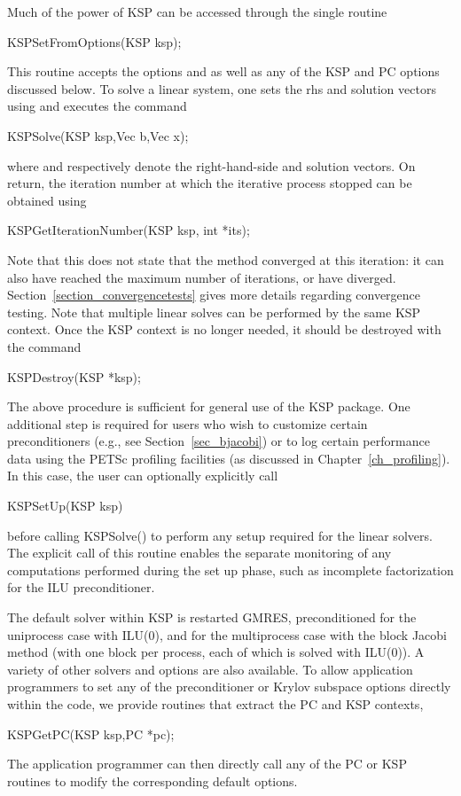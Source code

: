 Much of the power of KSP can be accessed through the single routine
\begin{tabbing}
  KSPSetFromOptions(KSP ksp);
\end{tabbing}
This 
routine accepts the options  and  as well as 
any of the KSP and PC options discussed below. 
To solve a linear system, one sets the rhs and solution vectors using
and executes the
command
\begin{tabbing}
  KSPSolve(KSP ksp,Vec b,Vec x);
\end{tabbing}
where  and  respectively denote the right-hand-side and
solution vectors.  On return, the iteration number at which
the iterative process stopped
%
can be obtained using 
\begin{tabbing}
  KSPGetIterationNumber(KSP ksp, int *its);
\end{tabbing}
Note that this does not state that the method converged at this
iteration: it can also have reached the maximum number of iterations,
or have diverged.
%
Section~\ref{section_convergencetests} gives more details regarding
convergence testing. Note that multiple linear solves can be performed by
the same KSP context. Once the KSP context is no longer needed, it should be
destroyed with the command 
\begin{tabbing}
  KSPDestroy(KSP *ksp);
\end{tabbing}

The above procedure is sufficient for general use of the KSP package.
One additional step is required for users who wish to customize certain 
preconditioners (e.g., see Section~\ref{sec_bjacobi}) or to log certain 
performance data using the PETSc profiling facilities (as discussed in 
Chapter~\ref{ch_profiling}).
In this case, the user can optionally explicitly call 
\begin{tabbing}
  KSPSetUp(KSP ksp)
\end{tabbing}
before calling KSPSolve() to perform any setup required for 
the linear solvers.  The explicit call of this routine enables the
separate monitoring of any computations performed during the set up
phase, such as incomplete factorization for the ILU preconditioner.

The default solver within KSP is restarted GMRES, preconditioned for
the uniprocess case with ILU(0), and for the multiprocess case
with the block Jacobi method (with one block per process, each of
which is solved with ILU(0)). A variety of other solvers
and options are also available.
To allow application programmers to set any of the preconditioner or 
Krylov subspace options directly within the code, we provide routines
that extract the PC and KSP contexts, 
\begin{tabbing}
  KSPGetPC(KSP ksp,PC *pc);\\
\end{tabbing}
The application programmer can then directly call any of the PC or KSP 
routines to modify the corresponding default options.   

